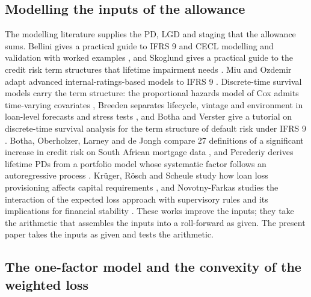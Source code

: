 \subsection{Modelling the inputs of the allowance}
\label{sec:rw-modelling}

The modelling literature supplies the PD, LGD and staging that the allowance sums.
Bellini gives a practical guide to IFRS 9 and CECL modelling and validation with worked examples \citep{bellini2019}, and Skoglund gives a practical guide to the credit risk term structures that lifetime impairment needs \citep{skoglund2017}.
Miu and Ozdemir adapt advanced internal-ratings-based models to IFRS 9 \citep{miuozdemir2017}.
Discrete-time survival models carry the term structure: the proportional hazards model of Cox admits time-varying covariates \citep{cox1972}, Breeden separates lifecycle, vintage and environment in loan-level forecasts and stress tests \citep{breeden2016}, and Botha and Verster give a tutorial on discrete-time survival analysis for the term structure of default risk under IFRS 9 \citep{bothaverster2025}.
Botha, Oberholzer, Larney and de Jongh compare 27 definitions of a significant increase in credit risk on South African mortgage data \citep{bothasicr2025}, and Perederiy derives lifetime PDs from a portfolio model whose systematic factor follows an autoregressive process \citep{perederiy2015}.
Kr\"uger, R\"osch and Scheule study how loan loss provisioning affects capital requirements \citep{kruger2018}, and Novotny-Farkas studies the interaction of the expected loss approach with supervisory rules and its implications for financial stability \citep{novotny2016}.
These works improve the inputs; they take the arithmetic that assembles the inputs into a roll-forward as given.
The present paper takes the inputs as given and tests the arithmetic.

\subsection{The one-factor model and the convexity of the weighted loss}
\label{sec:rw-onefactor}

